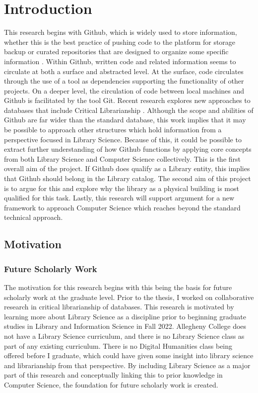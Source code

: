 \chapter{Introduction}
\label{ch:intro}

This research begins with Github, which is widely used to store information, whether this is the best practice of pushing code to the platform for storage backup or curated repositories that are designed to organize some specific information \cite{wu2017github}. Within Github, written code and related information seems to circulate at both a surface and abstracted level. At the surface, code circulates through the use of a tool as dependencies supporting the functionality of other projects. On a deeper level, the circulation of code between local machines and Github is facilitated by the tool Git. Recent research explores new approaches to databases that include Critical Librarianship \cite{ackermans2020appeal}. Although the scope and abilities of Github are far wider than the standard database, this work implies that it may be possible to approach other structures which hold information from a perspective focused in Library Science. Because of this, it could be possible to extract further understanding of how Github functions by applying core concepts from both Library Science and Computer Science collectively. This is the first overall aim of the project. If Github does qualify as a Library entity, this implies that Github should belong in the Library catalog. The second aim of this project is to argue for this and explore why the library as a physical building is most qualified for this task. Lastly, this research will support argument for a new framework to approach Computer Science which reaches beyond the standard technical approach. 


\section{Motivation} 
\label{sec:motivation}

\subsection{Future Scholarly Work}

The motivation for this research begins with this being the basis for future scholarly work at the graduate level. Prior to the thesis, I worked on collaborative research in critical librarianship of databases. This research is motivated by learning more about Library Science as a discipline prior to beginning graduate studies in Library and Information Science in Fall 2022. Allegheny College does not have a Library Science curriculum, and there is no Library Science class as part of any existing curriculum. There is no Digital Humanities class being offered before I graduate, which could have given some insight into library science and librarianship from that perspective. By including Library Science as a major part of this research and conceptually linking this to prior knowledge in Computer Science, the foundation for future scholarly work is created. 

